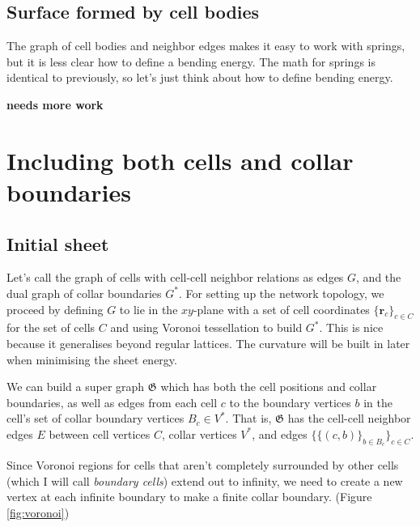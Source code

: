\documentclass[draft]{article}
\begin{document}
\subsection{Surface formed by cell bodies}

The graph of cell bodies and neighbor edges makes it easy to work with springs, but it is less clear how to define a bending energy. The math for springs is identical to previously, so let's just think about how to define bending energy.

\textbf{needs more work}


\section{Including both cells and collar boundaries}

\subsection{Initial sheet}
Let's call the graph of cells with cell-cell neighbor relations as edges $G$, and the dual graph of collar boundaries $G^*$. For setting up the network topology, we proceed by defining $G$ to lie in the $xy$-plane with a set of cell coordinates $\{\bm{r}_c\}_{c\in C}$ for the set of cells $C$ and using Voronoi tessellation to build $G^*$. This is nice because it generalises beyond regular lattices. The curvature will be built in later when minimising the sheet energy.

We can build a super graph $\mathfrak{G}$ which has both the cell positions and collar boundaries, as well as edges from each cell $c$ to the boundary vertices $b$ in the cell's set of collar boundary vertices $B_c \in V^*$. That is, $\mathfrak{G}$ has the cell-cell neighbor edges $E$ between cell vertices $C$, collar vertices $V^*$, and edges $\{ \{(c, b)\}_{b\in B_c} \}_{c\in C}$. 

Since Voronoi regions for cells that aren't completely surrounded by other cells (which I will call \textit{boundary cells}) extend out to infinity, we need to create a new vertex at each infinite boundary to make a finite collar boundary. (Figure \ref{fig:voronoi})
\end{document}
